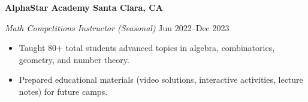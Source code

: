 \textbf{AlphaStar Academy \hfill Santa Clara, CA}\par
\textit{Math Competitions Instructor (Seasonal)} \hfill Jun 2022--Dec 2023

\begin{itemize}
	\item Taught 80+ total students advanced topics in algebra, combinatorics, geometry, and number theory.
	\item Prepared educational materials (video solutions, interactive activities, lecture notes) for future camps.
\end{itemize}\par
